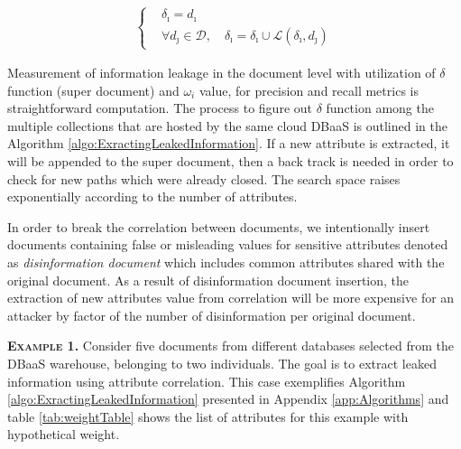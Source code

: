 \begin{equation}
\label{eq:SuperDocument}
\begin{aligned}
\begin{cases}
&\delta_{\imath}=d_\imath \\
&\forall d_\jmath \in \mathcal{D}, \quad \delta_{\imath}= \delta_{\imath} \cup \mathcal{L}(\delta_{\imath},d_\jmath)
\end{cases}
\end{aligned}
\end{equation}


Measurement of information leakage in the document level with utilization of $\delta$ function (super document) and $\omega_i$ value, for precision and recall metrics is straightforward computation. The process to figure out $\delta$ function among the multiple collections that are hosted by the same cloud DBaaS is outlined in the Algorithm \ref{algo:ExractingLeakedInformation}. If a new attribute is extracted, it will be appended to the super document, then a back track is needed in order to check for new paths which were already closed. The search space raises exponentially according to the number of attributes.

In order to break the correlation between documents, we intentionally insert documents containing false or misleading values for sensitive attributes denoted as \emph{disinformation document} which includes common attributes shared with the original document. As a result of disinformation document insertion, the extraction of new attributes value from correlation will be more expensive for an attacker by factor of the number of disinformation per original document. 


\noindent \textsc{\textbf{Example 1.}} Consider five documents from different databases selected from the DBaaS warehouse, belonging to two individuals. The goal is to extract leaked information using attribute correlation. This case exemplifies Algorithm \ref{algo:ExractingLeakedInformation} presented in Appendix \ref{app:Algorithms} and table \ref{tab:weightTable} shows the list of attributes for this example with hypothetical weight.




